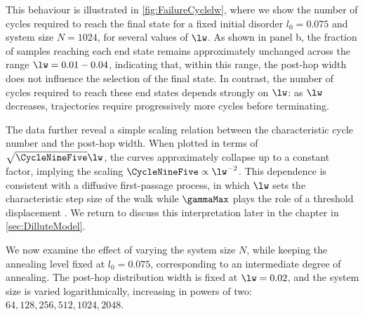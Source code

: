\documentclass[asymmetricmargins]{library/duthesis}%
\begin{document}
This behaviour is illustrated in \cref{fig:FailureCyclelw}, where we show the number of cycles required to reach the final state for a fixed initial disorder $l_0 = 0.075$ and system size $N = 1024$, for several values of $\lw$. As shown in panel b, the fraction of samples reaching each end state remains approximately unchanged across the range $\lw=0.01-0.04$, indicating that, within this range, the post-hop width does not influence the selection of the final state. In contrast, the number of cycles required to reach these end states depends strongly on $\lw$: as $\lw$ decreases, trajectories require progressively more cycles before terminating.

The data further reveal a simple scaling relation between the characteristic cycle number and the post-hop width. When plotted in terms of $\sqrt{\CycleNineFive}\lw$, the curves approximately collapse up to a constant factor, implying the scaling $\CycleNineFive \propto \lw^{-2}$. This dependence is consistent with a diffusive first-passage process, in which $\lw$ sets the characteristic step size of the walk while $\gammaMax$ plays the role of a threshold displacement \cite{Redner_2001}. We return to discuss this interpretation later in the chapter in \cref{sec:DilluteModel}.

We now examine the effect of varying the system size $N$, while keeping the annealing level fixed at $l_0 = 0.075$, corresponding to an intermediate degree of annealing. The post-hop distribution width is fixed at $\lw=0.02$, and the system size is varied logarithmically, increasing in powers of two: $64, 128, 256, 512, 1024, 2048$.
\end{document}
